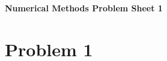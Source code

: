 \newcommand{\doctitle}{Numerical Methods Problem Sheet 1}



\begin{center}{\bfseries\Huge\doctitle}\end{center}

\section{Problem 1}
\subsection{}

\subsection{}

\subsection{}

\subsection{}

\subsection{}

\subsection{}

\subsection{}

\subsection{}

\subsection{}

\subsection{}

